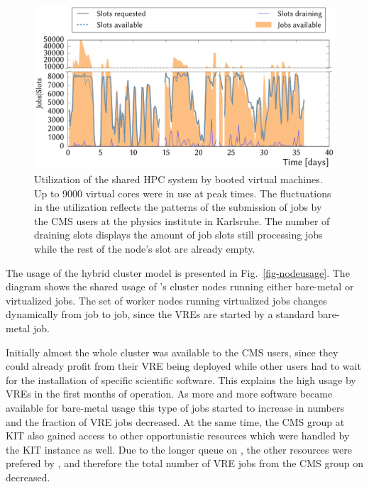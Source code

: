 \begin{figure}
\begin{center}
  \includegraphics[width=1.0\linewidth]{NEMO_KIT_utiliztion.pdf}
  \caption{Utilization of the shared HPC system by booted virtual machines. Up to 9000 virtual cores were in use at peak times. The fluctuations in the utilization reflects the patterns of the submission of jobs by the CMS users at the physics institute in Karlsruhe. The number of draining slots displays the amount of job slots still processing jobs while the rest of the node's slot are already empty.}
  \label{fig-frplots}
\end{center}
\end{figure}

The usage of the hybrid cluster model is presented in Fig.~\ref{fig-nodeusage}.
The diagram shows the shared usage of \NEMO's cluster nodes running either
bare-metal or virtualized jobs. The set of worker nodes running
virtualized jobs changes  dynamically from job to job, since the VREs
are started by a standard bare-metal job.


Initially almost the whole \NEMO cluster was available to the CMS users, since they could already profit from their VRE being deployed while other users had to wait for the installation of specific scientific software.
This explains the high usage by VREs in the first months of operation. As more and more software became available for bare-metal usage this type of jobs started to increase in numbers and the fraction of VRE jobs decreased.
At the same time, the CMS group at KIT also gained access to other opportunistic resources which were handled by the KIT \Roced instance as well. Due to the longer queue on \NEMO, the other resources were prefered by \Roced, and therefore the total number of VRE jobs from the CMS group on \NEMO decreased.



